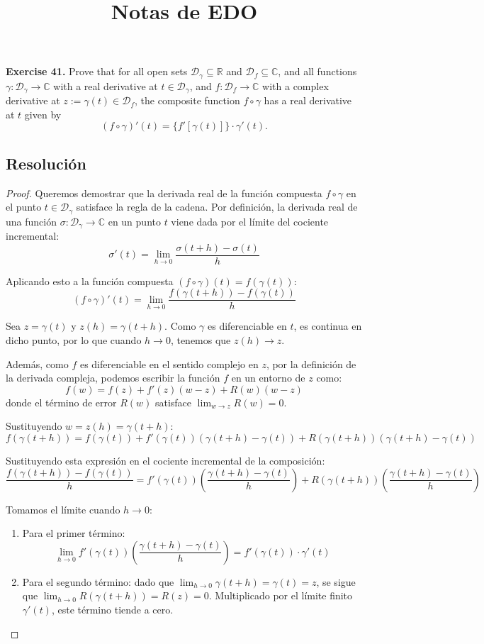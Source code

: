 \documentclass[11pt,a4paper]{article}
\title{\textbf{Notas de EDO}}
\author{}
\date{}
\theoremstyle{definition}
\theoremstyle{plain}
\theoremstyle{remark}
\begin{document}
	\noindent \textbf{Exercise 41.} Prove that for all open sets $\mathcal{D}_\gamma \subseteq \mathbb{R}$ and $\mathcal{D}_f \subseteq \mathbb{C}$, and all functions $\gamma : \mathcal{D}_\gamma \to \mathbb{C}$ with a real derivative at $t \in \mathcal{D}_\gamma$, and $f : \mathcal{D}_f \to \mathbb{C}$ with a complex derivative at $z := \gamma(t) \in \mathcal{D}_f$, the composite function $f \circ \gamma$ has a real derivative at $t$ given by
	\[
	(f \circ \gamma)'(t) = \{f'[\gamma(t)]\} \cdot \gamma'(t).
	\]
	
	\subsection*{Resolución}
	
	\begin{proof}
		Queremos demostrar que la derivada real de la función compuesta $f \circ \gamma$ en el punto $t \in \mathcal{D}_\gamma$ satisface la regla de la cadena. Por definición, la derivada real de una función $\sigma : \mathcal{D}_\gamma \to \mathbb{C}$ en un punto $t$ viene dada por el límite del cociente incremental:
		\[
		\sigma'(t) = \lim_{h \to 0} \frac{\sigma(t+h) - \sigma(t)}{h}
		\]
		
		Aplicando esto a la función compuesta $(f \circ \gamma)(t) = f(\gamma(t))$:
		\[
		(f \circ \gamma)'(t) = \lim_{h \to 0} \frac{f(\gamma(t+h)) - f(\gamma(t))}{h}
		\]
		
		Sea $z = \gamma(t)$ y $z(h) = \gamma(t+h)$. Como $\gamma$ es diferenciable en $t$, es continua en dicho punto, por lo que cuando $h \to 0$, tenemos que $z(h) \to z$. 
		
		Además, como $f$ es diferenciable en el sentido complejo en $z$, por la definición de la derivada compleja, podemos escribir la función $f$ en un entorno de $z$ como:
		\[
		f(w) = f(z) + f'(z)(w - z) + R(w)(w - z)
		\]
		donde el término de error $R(w)$ satisface $\lim_{w \to z} R(w) = 0$.
		
		Sustituyendo $w = z(h) = \gamma(t+h)$:
		\[
		f(\gamma(t+h)) = f(\gamma(t)) + f'(\gamma(t)) \left( \gamma(t+h) - \gamma(t) \right) + R(\gamma(t+h)) \left( \gamma(t+h) - \gamma(t) \right)
		\]
		
		Sustituyendo esta expresión en el cociente incremental de la composición:
		\[
		\frac{f(\gamma(t+h)) - f(\gamma(t))}{h} = f'(\gamma(t)) \left( \frac{\gamma(t+h) - \gamma(t)}{h} \right) + R(\gamma(t+h)) \left( \frac{\gamma(t+h) - \gamma(t)}{h} \right)
		\]
		
		Tomamos el límite cuando $h \to 0$:
		\begin{enumerate}
			\item Para el primer término:
			\[
			\lim_{h \to 0} f'(\gamma(t)) \left( \frac{\gamma(t+h) - \gamma(t)}{h} \right) = f'(\gamma(t)) \cdot \gamma'(t)
			\]
			\item Para el segundo término: dado que $\lim_{h \to 0} \gamma(t+h) = \gamma(t) = z$, se sigue que $\lim_{h \to 0} R(\gamma(t+h)) = R(z) = 0$. Multiplicado por el límite finito $\gamma'(t)$, este término tiende a cero.
		\end{enumerate}
		

\end{proof}
\end{document}
